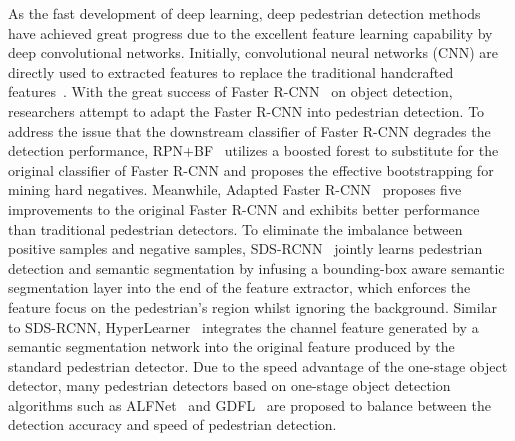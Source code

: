 \documentclass[journal]{IEEEtran}
\newcommand{\peicomment}[1]{\textcolor[rgb]{1,0,0} {#1}}
\begin{document}
As the fast development of deep learning, deep pedestrian detection methods~\cite{wang2018repulsion,li2017scale, wang2018pcn,  zhang2018occlusion,pang2019mask, liu2018learning, xie2020count, huang2020nms} have achieved great progress due to the excellent feature learning capability by deep convolutional networks. Initially, convolutional neural networks (CNN) are directly used to extracted features to replace the traditional handcrafted features~\cite{yang2015convolutional,cao2017learning}. With the great success of Faster R-CNN~\cite{ren2016faster} on object detection, researchers attempt to adapt the Faster R-CNN into pedestrian detection. To address the issue that the downstream classifier of Faster R-CNN degrades the detection performance, RPN+BF~\cite{zhang2016faster} utilizes a boosted forest to substitute for the original classifier of Faster R-CNN and proposes the effective bootstrapping for mining hard negatives. Meanwhile, Adapted Faster R-CNN~\cite{zhang2017citypersons} proposes five improvements to the original Faster R-CNN and exhibits better performance than traditional pedestrian detectors. To eliminate the imbalance between positive samples and negative samples, SDS-RCNN~\cite{brazil2017illuminating} jointly learns pedestrian detection and semantic segmentation by infusing a bounding-box aware semantic segmentation layer into the end of the feature extractor, which enforces the feature focus on the pedestrian's region whilst ignoring the background. Similar to SDS-RCNN, HyperLearner~\cite{mao2017can} integrates the channel feature generated by a semantic segmentation network into the original feature produced by the standard pedestrian detector. Due to the speed advantage of the one-stage object detector, many pedestrian detectors based on one-stage object detection algorithms such as ALFNet~\cite{liu2018learning} and GDFL~\cite{lin2018graininess} are proposed to balance between the detection accuracy and speed of pedestrian detection.





\begin{comment}
\peicomment{The second category of pedestrian detectors aim to deal with various scale of pedestrians~\cite{zhang2017citypersons,lin2018graininess, liu2018learning, li2017scale}. These methods either utilize different level of feature maps to perform multi-scale prediction~\cite{lin2018graininess,liu2018learning} or design scale-aware sub-networks~\cite{li2017scale}.}

\peicomment{Unlike the aforementioned methods for pedestrian detection, we aim to address the challenge of detecting pedestrians with substantial appearance diversities by performing contrastive learning to guide the feature learning to eliminate the appearance diversities in the learned feature space while maximizing the distance between pedestrians and background.}
\end{comment}
\end{document}
